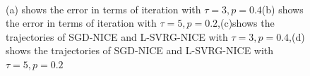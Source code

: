 \documentclass[12pt,a4paper]{article}
\begin{document}
\begin{figure}
	\centering
	\\ %
	
	
	\caption{ (a) shows the error in terms of iteration with $\tau = 3, p = 0.4$(b) shows the error in terms of iteration with $\tau = 5, p = 0.2$,(c)shows the trajectories of SGD-NICE and L-SVRG-NICE with $\tau = 3, p = 0.4$,(d) shows the trajectories of SGD-NICE and L-SVRG-NICE with $\tau = 5, p = 0.2$} %
	\label{img2}
\end{figure}



















	
\end{document}
